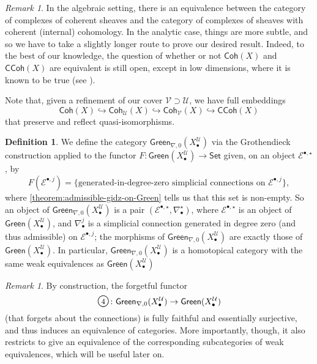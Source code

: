 \documentclass[11pt,fleqn]{article}
\theoremstyle{plain}
\theoremstyle{definition}
\newtheorem{definition}[theorem]{Definition}
\theoremstyle{remark}
\newtheorem{remark}[theorem]{Remark}
\numberwithin{equation}{theorem}
\newcommand{\cover}{\mathcal{U}}
\newcommand{\anothercover}{\mathcal{V}}
\newcommand{\anotherbullet}{\star}
\newcommand{\gcohX}{\mathsf{Coh}(X)}
\newcommand{\gcohUX}{\mathsf{Coh}_{\cover}(X)}
\newcommand{\gcohVX}{\mathsf{Coh}_{\anothercover}(X)}
\newcommand{\gccohX}{\mathsf{CCoh}(X)}
\newcommand{\greenX}{\mathsf{Green}(X_\bullet^\cover)}
\newcommand{\greenzeroX}{\mathsf{Green}_{\nabla,0}(X_\bullet^\cover)}
\newcommand{\numberincircle}[1]{\text{\Large\textcircled{\small #1}}}
\begin{document}
        \begin{remark}
            In the algebraic setting, there is an equivalence between the category of complexes of coherent sheaves and the category of complexes of sheaves with coherent (internal) cohomology.
            In the analytic case, things are more subtle, and so we have to take a slightly longer route to prove our desired result.
            Indeed, to the best of our knowledge, the question of whether or not $\gcohX$ and $\gccohX$ are equivalent is still open, except in low dimensions, where it is known to be true (see \cite[§2.2.2]{Yu2013}).

            Note that, given a refinement of our cover $\anothercover\supset\cover$, we have full embeddings
            \[
                \gcohX \hookrightarrow \gcohUX \hookrightarrow \gcohVX \hookrightarrow \gccohX
            \]
            that preserve and reflect quasi-isomorphisms.
        \end{remark}

        \begin{definition}\label{definition:cartvectzeroX-and-greenzeroX}
            We define the category $\greenzeroX$ via the Grothendieck construction applied to the functor $F\colon\greenX\to\mathsf{Set}$ given, on an object $\mathcal{E}^{\bullet,\anotherbullet}$, by
            \[
                F(\mathcal{E}^{\bullet,j}) = \big\{ \mbox{generated-in-degree-zero simplicial connections on $\mathcal{E}^{\bullet,j}$} \big\},
            \]
            where \cref{theorem:admissible-gidz-on-Green} tells us that this set is non-empty.
            So an object of $\greenzeroX$ is a pair $(\mathcal{E}^{\bullet,\anotherbullet},\nabla_\bullet^\anotherbullet)$, where $\mathcal{E}^{\bullet,\anotherbullet}$ is an object of $\greenX$, and $\nabla_\bullet^j$ is a simplicial connection generated in degree zero (and thus admissible) on $\mathcal{E}^{\bullet,j}$; the morphisms of $\greenzeroX$ are exactly those of $\greenX$.
            In particular, $\greenzeroX$ is a homotopical category with the same weak equivalences as $\greenX$
        \end{definition}

        \begin{remark}\label{remark:4-is-an-equivalence-of-1-cats}
            By construction, the forgetful functor
            \[
                \numberincircle{4}\colon
                \greenzeroX \to \greenX
            \]
            (that forgets about the connections) is fully faithful and essentially surjective, and thus induces an equivalence of categories.
            More importantly, though, it also restricts to give an equivalence of the corresponding subcategories of weak equivalences, which will be useful later on.
        \end{remark}
\end{document}
